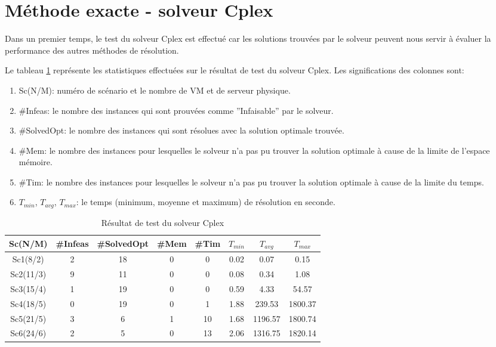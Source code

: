 \documentclass[twoside,fleqn]{EPURapport}
\begin{document}
\section{Méthode exacte - solveur Cplex}
Dans un premier temps, le test du solveur Cplex est effectué car les solutions trouvées par le solveur peuvent nous servir à évaluer la performance des autres méthodes de résolution.

 
Le tableau \ref{tab_cplex} représente les statistiques effectuées sur le résultat de test du solveur Cplex. Les significations des colonnes sont:
\begin{enumerate}
	\item Sc(N/M): numéro de scénario et le nombre de VM et de serveur physique.
	\item \#Infeas: le nombre des instances qui sont prouvées comme ''Infaisable'' par le solveur.
	\item \#SolvedOpt: le nombre des instances qui sont résolues avec la solution optimale trouvée.
	\item \#Mem: le nombre des instances pour lesquelles le solveur n'a pas pu trouver la solution optimale à cause de la limite de l'espace mémoire.
	\item \#Tim: le nombre des instances pour lesquelles le solveur n'a pas pu trouver la solution optimale à cause de la limite du temps.
	\item $T_{min}$, $T_{avg}$, $T_{max}$: le temps (minimum, moyenne et maximum) de résolution en seconde.
\end{enumerate}
\bigskip


\begin{table}[h]
    \centering
    \begin{tabular}{|c|c|c|c|c|c|c|c|}
    	\hline
    	Sc(N/M)	& \#Infeas & \#SolvedOpt	& \#Mem & \#Tim & $T_{min}$ & $T_{avg}$	& $T_{max}$ \\ \hline
		Sc1(8/2) & 2 & 18 & 0 & 0 &  0.02 &  0.07 &  0.15 \\ \hline
		Sc2(11/3) & 9 & 11 & 0 & 0 &  0.08 &  0.34 &  1.08 \\ \hline
		Sc3(15/4) & 1 & 19 & 0 & 0 &  0.59 &  4.33 &  54.57 \\ \hline
		Sc4(18/5) & 0 & 19 & 0 & 1 &  1.88 &  239.53 &  1800.37 \\ \hline
		Sc5(21/5) & 3 & 6 & 1 & 10 &  1.68 &  1196.57 &  1800.74 \\ \hline
		Sc6(24/6) & 2 & 5 & 0 & 13 &  2.06 &  1316.75 &  1820.14 \\	\hline
    \end{tabular}
    \label{tab_cplex}
    \caption{Résultat de test du solveur Cplex}
\end{table}
\bigskip
\end{document}
